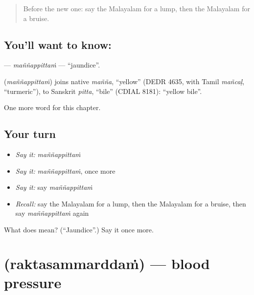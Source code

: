 \label{lesson:ML-C275-mannappittam}



\begin{quote}
Before the new one: say the Malayalam for a lump, then the Malayalam for a bruise.
\end{quote}

\subsection*{You'll want to know: }
\textbf{} — \emph{maññappittaṁ} — \textquotedblleft{}jaundice\textquotedblright{}.

\begin{cousinweb}
\textbf{} (\emph{maññappittaṁ}) joins native \emph{mañña}, \textquotedblleft{}yellow\textquotedblright{} (DEDR 4635, with Tamil \emph{mañcaḷ}, \textquotedblleft{}turmeric\textquotedblright{}), to Sanskrit \emph{pitta}, \textquotedblleft{}bile\textquotedblright{} (CDIAL 8181): \textquotedblleft{}yellow bile\textquotedblright{}.
\end{cousinweb}

\begin{grammarlens}[title={What you've built}]
One more word for this chapter.
\end{grammarlens}

\subsection*{Your turn}
\begin{itemize}
\raggedright
  \item \emph{Say it:} \emph{maññappittaṁ}
  \item \emph{Say it:} \emph{maññappittaṁ}, once more
  \item \emph{Say it:} say \emph{maññappittaṁ}
  \item \emph{Recall:} say the Malayalam for a lump, then the Malayalam for a bruise, then say \emph{maññappittaṁ} again
\end{itemize}

\begin{tcolorbox}[breakable,colback=teal!4,colframe=teal!35!black,title={Before you move on}]
What does  mean? (\textquotedblleft{}Jaundice\textquotedblright{}.) Say it once more.
\end{tcolorbox}
\section[\texorpdfstring{\ml{രക്തസമ്മർദ്ദം} (raktasammarddaṁ)}{രക്തസമ്മർദ്ദം (raktasammarddaṁ)}]{ (raktasammarddaṁ) — blood pressure}


